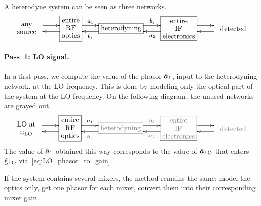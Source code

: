 A heterodyne system can be seen as three networks.
\begin{equation*}
    \entrymodifiers={+[F]}
    \xymatrix{
        *+++\txt{any\\source}
        \ar@<1ex>[r]
        &
        \txt{entire\\RF\\optics}
        \ar@<1ex>[l]
        \ar@<1ex>[r]^-{\vectcp{a}_1}
        &
        \txt{heterodyning}
        \ar@<1ex>[l]^-{\vectcp{b}_1}
        \ar@<1ex>[r]^-{\vectcp{b}_2}
        &
        \txt{entire\\IF\\electronics}
        \ar@<1ex>[l]^-{\vectcp{a}_2}
        \ar@<1ex>[r]
        &
        *+++\txt{detected}
        \ar@<1ex>[l]
    }
\end{equation*}

\paragraph{Pass~1: LO signal.}
In a first pass, we compute the value of the phasor $\hat{\bm{a}}_1$, input to the heterodyning network, at the LO frequency.
This is done by modeling only the optical part of the system at the LO frequency.
On the following diagram, the unused networks are grayed out.
\begin{equation*}
    \entrymodifiers={+[F]}
    \xymatrix{
        *+++\txt{LO at\\$\omega_\text{LO}$}
        \ar@<1ex>[r]
        &
        \txt{entire\\RF\\optics}
        \ar@<1ex>[l]
        \ar@<1ex>[r]^-{\vectcp{a}_1}
        &
        \txt{\color{gray}heterodyning}
        \ar@<1ex>[l]^-{\color{gray}\vectcp{b}_1}
        \ar@<1ex>[r]^-{\color{gray}\vectcp{b}_2}
        &
        \txt{\color{gray}entire\\\color{gray}IF\\\color{gray}electronics}
        \ar@<1ex>[l]^-{\color{gray}\vectcp{a}_2}
        \ar@<1ex>[r]
        &
        *+++\txt{\color{gray}detected}
        \ar@<1ex>[l]
    }
\end{equation*}
The value of $\hat{\bm{a}}_1$ obtained this way corresponds to the value of $\hat{\bm{a}}_\text{LO}$ that enters $\hat{\mathrm{g}}_\text{LO}$ via~\cref{eq:LO_phasor_to_gain}.

If the system contains several mixers, the method remains the same: model the optics only, get one phasor for each mixer, convert them into their corresponding mixer gain.

